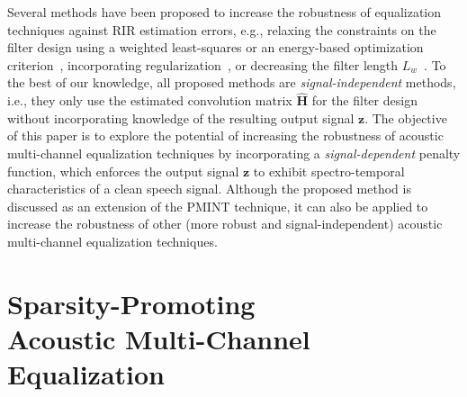 \documentclass{article}
\begin{document}
Several methods have been proposed to increase the robustness of equalization techniques against RIR estimation errors, e.g., relaxing the constraints on the filter design using a weighted least-squares or an energy-based optimization criterion~\cite{Kallinger_ICASSP_2006,Lim_ITASLP_2014}, incorporating regularization~\cite{Hikichi_EURASIP_2007,Kodrasi_ITASLP_2013}, or decreasing the filter length $L_w$~\cite{Kodrasi_EUSIPCO_2012}.
To the best of our knowledge, all proposed methods are {\textit{signal-independent}} methods, i.e., they only use the estimated convolution matrix $\hat{\mathbf{H}}$ for the filter design without incorporating knowledge of the resulting output signal $\mathbf{z}$.
The objective of this paper is to explore the potential of increasing the robustness of acoustic multi-channel equalization techniques by incorporating a {\textit{signal-dependent}} penalty function, which enforces the output signal $\mathbf{z}$ to exhibit spectro-temporal characteristics of a clean speech signal. Although the proposed method is discussed as an extension of the PMINT technique, it can also be applied to increase the robustness of other (more robust and signal-independent) acoustic multi-channel equalization techniques.

\section{Sparsity-Promoting \\ Acoustic Multi-Channel Equalization}
\label{sec: sparsity}
\end{document}
